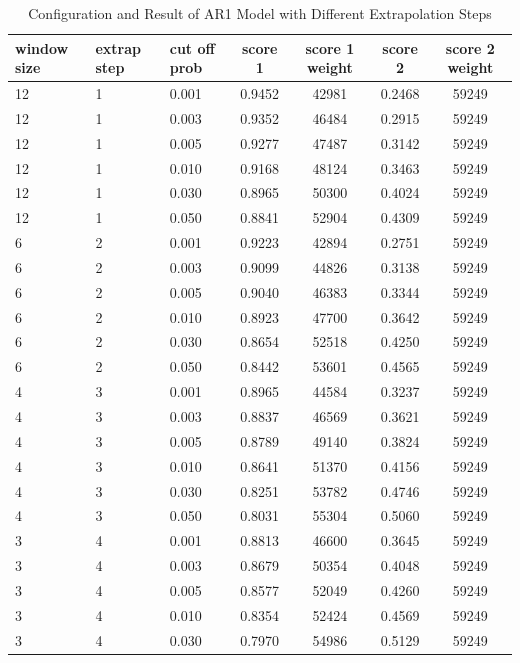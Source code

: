 \documentclass{article}
\begin{document}
\begin{longtable}[htbp]{l|l|l|*{4}{c}}
    \caption{Configuration and Result of AR1 Model with Different Extrapolation Steps}
    \label{tab:tab1.4.1} \\
    \textbf{window size} & \textbf{extrap step} & \textbf{cut off prob} &
    \textbf{score 1} & \textbf{score 1 weight} & \textbf{score 2} &
    \textbf{score 2 weight} \\
    \hline
    12 & 1 & 0.001 & 0.9452 & 42981 & 0.2468 & 59249\\
    12 & 1 & 0.003 & 0.9352 & 46484 & 0.2915 & 59249\\
    12 & 1 & 0.005 & 0.9277 & 47487 & 0.3142 & 59249\\
    12 & 1 & 0.010 & 0.9168 & 48124 & 0.3463 & 59249\\
    12 & 1 & 0.030 & 0.8965 & 50300 & 0.4024 & 59249\\
    12 & 1 & 0.050 & 0.8841 & 52904 & 0.4309 & 59249\\
    6 & 2 & 0.001 & 0.9223 & 42894 & 0.2751 & 59249\\
    6 & 2 & 0.003 & 0.9099 & 44826 & 0.3138 & 59249\\
    6 & 2 & 0.005 & 0.9040 & 46383 & 0.3344 & 59249\\
    6 & 2 & 0.010 & 0.8923 & 47700 & 0.3642 & 59249\\
    6 & 2 & 0.030 & 0.8654 & 52518 & 0.4250 & 59249\\
    6 & 2 & 0.050 & 0.8442 & 53601 & 0.4565 & 59249\\
    4 & 3 & 0.001 & 0.8965 & 44584 & 0.3237 & 59249\\
    4 & 3 & 0.003 & 0.8837 & 46569 & 0.3621 & 59249\\
    4 & 3 & 0.005 & 0.8789 & 49140 & 0.3824 & 59249\\
    4 & 3 & 0.010 & 0.8641 & 51370 & 0.4156 & 59249\\
    4 & 3 & 0.030 & 0.8251 & 53782 & 0.4746 & 59249\\
    4 & 3 & 0.050 & 0.8031 & 55304 & 0.5060 & 59249\\
    3 & 4 & 0.001 & 0.8813 & 46600 & 0.3645 & 59249\\
    3 & 4 & 0.003 & 0.8679 & 50354 & 0.4048 & 59249\\
    3 & 4 & 0.005 & 0.8577 & 52049 & 0.4260 & 59249\\
    3 & 4 & 0.010 & 0.8354 & 52424 & 0.4569 & 59249\\
    3 & 4 & 0.030 & 0.7970 & 54986 & 0.5129 & 59249\\

\end{longtable}
\end{document}
